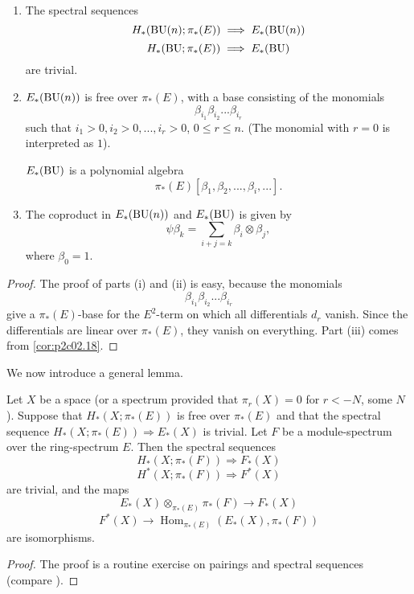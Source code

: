 \documentclass[../main]{subfiles}
\begin{document}
\begin{lemma}
\label{lem:p2c04.1}
\begin{enumerate}
    \item The spectral sequences
    \[H_\ast(\mathrm{BU}(n);\pi_\ast(E))\implies E_\ast(\mathrm{BU}(n))\]
    \[H_\ast(\mathrm{BU};\pi_\ast(E))\implies E_\ast(\mathrm{BU})\]
    are trivial.
    \item $E_\ast(\mathrm{BU}(n))$ is free over $\pi_\ast(E)$, with a base consisting of the monomials
    \[\beta_{i_1}\beta_{i_2}...\beta_{i_r}\]
    such that $i_1>0, i_2>0, ..., i_r>0$, $0\leq r \leq n$. (The monomial with $r=0$ is interpreted as $1$).
    
    $E_\ast(\mathrm{BU})$ is a polynomial algebra
    \[\pi_\ast(E)[\beta_1,\beta_2,...,\beta_i, ...].\]
    \item The coproduct in $E_\ast(\mathrm{BU}(n))$ and $E_\ast(\mathrm{BU})$ is given by 
    \[\psi\beta_k=\sum_{i+j=k}\beta_i\otimes\beta_j,\]
    where $\beta_0=1$.
\end{enumerate}
\end{lemma}

\begin{proof}
The proof of parts (i) and (ii) is easy, because the monomials
\[\beta_{i_1}\beta_{i_2}...\beta_{i_r}\]
give a $\pi_\ast(E)$-base for the $E^2$-term on which all differentials $d_r$ vanish. Since the differentials are linear over $\pi_\ast(E)$, they vanish on everything. Part (iii) comes from \eqref{cor:p2c02.18}.
\end{proof}

We now introduce a general lemma.
\begin{lemma}
\label{lem:p2c04.2}
Let $X$ be a space (or a spectrum provided that $\pi_r(X)=0$ for $r<-N$, some $N$). Suppose that $H_\ast(X;\pi_\ast(E))$ is free over $\pi_\ast(E)$ and that the spectral sequence $H_\ast(X;\pi_\ast(E))\Longrightarrow E_\ast(X)$ is trivial. Let $F$ be a module-spectrum over the ring-spectrum $E$. Then the spectral sequences
\[H_\ast(X;\pi_\ast(F))\Longrightarrow F_\ast(X)\]
\[H^\ast(X;\pi_\ast(F))\Longrightarrow F^\ast(X)\]
are trivial, and the maps
\[E_\ast(X)\otimes_{\pi_\ast(E)}\pi_\ast(F)\longrightarrow F_\ast(X)\]
\[F^\ast(X)\longrightarrow \operatorname{Hom}_{\pi_\ast(E)}(E_\ast(X),\pi_\ast(F))\]
are isomorphisms.
\end{lemma}

\begin{proof}
The proof is a routine exercise on pairings and spectral sequences (compare \cite[p.~20, Proposition 17]{adams3}).
\end{proof}
\end{document}
